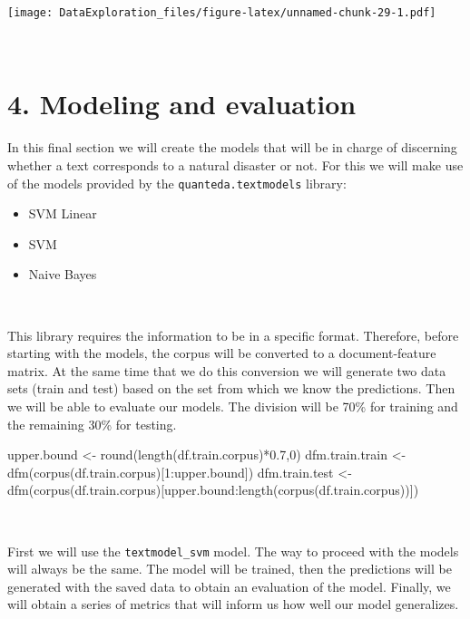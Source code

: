 \documentclass[
]{article}
\newenvironment{Shaded}{\begin{snugshade}}{\end{snugshade}}
\newcommand{\DecValTok}[1]{\textcolor[rgb]{0.00,0.00,0.81}{#1}}
\newcommand{\FloatTok}[1]{\textcolor[rgb]{0.00,0.00,0.81}{#1}}
\newcommand{\FunctionTok}[1]{\textcolor[rgb]{0.00,0.00,0.00}{#1}}
\newcommand{\NormalTok}[1]{#1}
\newcommand{\OtherTok}[1]{\textcolor[rgb]{0.56,0.35,0.01}{#1}}
\newcommand{\SpecialCharTok}[1]{\textcolor[rgb]{0.00,0.00,0.00}{#1}}
\providecommand{\tightlist}{%
  \setlength{\itemsep}{0pt}\setlength{\parskip}{0pt}}
\begin{document}
\texttt{[image: DataExploration\_files/figure-latex/unnamed-chunk-29-1.pdf]}

~

\hypertarget{modeling-and-evaluation}{%
\section{4. Modeling and evaluation}\label{modeling-and-evaluation}}

In this final section we will create the models that will be in charge
of discerning whether a text corresponds to a natural disaster or not.
For this we will make use of the models provided by the
\texttt{quanteda.textmodels} library:

\begin{itemize}
\tightlist
\item
  SVM Linear
\item
  SVM
\item
  Naive Bayes
\end{itemize}

~

This library requires the information to be in a specific format.
Therefore, before starting with the models, the corpus will be converted
to a document-feature matrix. At the same time that we do this
conversion we will generate two data sets (train and test) based on the
set from which we know the predictions. Then we will be able to evaluate
our models. The division will be 70\% for training and the remaining
30\% for testing.

\begin{Shaded}
\begin{Highlighting}[]
\NormalTok{upper.bound }\OtherTok{\textless{}{-}} \FunctionTok{round}\NormalTok{(}\FunctionTok{length}\NormalTok{(df.train.corpus)}\SpecialCharTok{*}\FloatTok{0.7}\NormalTok{,}\DecValTok{0}\NormalTok{)}
\NormalTok{dfm.train.train }\OtherTok{\textless{}{-}} \FunctionTok{dfm}\NormalTok{(}\FunctionTok{corpus}\NormalTok{(df.train.corpus)[}\DecValTok{1}\SpecialCharTok{:}\NormalTok{upper.bound])}
\NormalTok{dfm.train.test }\OtherTok{\textless{}{-}} \FunctionTok{dfm}\NormalTok{(}\FunctionTok{corpus}\NormalTok{(df.train.corpus)[upper.bound}\SpecialCharTok{:}\FunctionTok{length}\NormalTok{(}\FunctionTok{corpus}\NormalTok{(df.train.corpus))])}
\end{Highlighting}
\end{Shaded}

~

First we will use the \texttt{textmodel\_svm} model. The way to proceed
with the models will always be the same. The model will be trained, then
the predictions will be generated with the saved data to obtain an
evaluation of the model. Finally, we will obtain a series of metrics
that will inform us how well our model generalizes.
\end{document}
